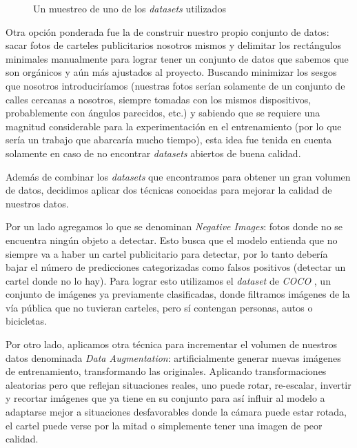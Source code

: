 \documentclass[a4paper]{article}
\begin{document}
\begin{figure}[H]
\caption{Un muestreo de uno de los \textit{datasets} utilizados}
\end{figure}

Otra opción ponderada fue la de construir nuestro propio conjunto de datos: sacar fotos de carteles publicitarios nosotros mismos y delimitar los rectángulos minimales manualmente para lograr tener un conjunto de datos que sabemos que son orgánicos y aún más ajustados al proyecto. Buscando minimizar los sesgos que nosotros introduciríamos (nuestras fotos serían solamente de un conjunto de calles cercanas a nosotros, siempre tomadas con los mismos dispositivos, probablemente con ángulos parecidos, etc.) y sabiendo que se requiere una magnitud considerable para la experimentación en el entrenamiento (por lo que sería un trabajo que abarcaría mucho tiempo), esta idea fue tenida en cuenta solamente en caso de no encontrar \textit{datasets} abiertos de buena calidad. \medskip

Además de combinar los \textit{datasets} que encontramos para obtener un gran volumen de datos, decidimos aplicar dos técnicas conocidas para mejorar la calidad de nuestros datos.

Por un lado agregamos lo que se denominan \textit{Negative Images}: fotos donde no se encuentra ningún objeto a detectar. Esto busca que el modelo entienda que no siempre va a haber un cartel publicitario para detectar, por lo tanto debería bajar el número de predicciones categorizadas como falsos positivos (detectar un cartel donde no lo hay). Para lograr esto utilizamos el \textit{dataset} de \textit{COCO} \cite{coco}, un conjunto de imágenes ya previamente clasificadas, donde filtramos imágenes de la vía pública que no tuvieran carteles, pero sí contengan personas, autos o bicicletas.

Por otro lado, aplicamos otra técnica para incrementar el volumen de nuestros datos denominada \textit{Data Augmentation}: artificialmente generar nuevas imágenes de entrenamiento, transformando las originales. Aplicando transformaciones aleatorias pero que reflejan situaciones reales, uno puede rotar, re-escalar, invertir y recortar imágenes que ya tiene en su conjunto para así influir al modelo a adaptarse mejor a situaciones desfavorables donde la cámara puede estar rotada, el cartel puede verse por la mitad o simplemente tener una imagen de peor calidad.
\end{document}
